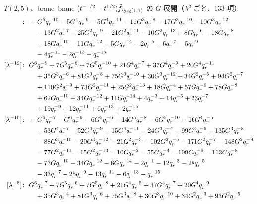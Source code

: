 $T(2,5)$、brane--brane $(t^{-1/2} - t^{1/2})\hat f_{\yoneone}$ の $G$ 展開（$\lambda^\beta$ ごと、133 項）
\begin{align*}
[\lambda^{-14}]\colon\ & -G^{5} \qr^{-10} -5 G^{4} \qr^{-9} -5 G^{4} \qr^{-11} -11 G^{3} \qr^{-8} -17 G^{3} \qr^{-10} -10 G^{3} \qr^{-12} \\
& \quad -13 G^{2} \qr^{-7} -25 G^{2} \qr^{-9} -21 G^{2} \qr^{-11} -10 G^{2} \qr^{-13} -8 G \qr^{-6} -18 G \qr^{-8} \\
& \quad -18 G \qr^{-10} -11 G \qr^{-12} -5 G \qr^{-14} -2 \qr^{-5} -6 \qr^{-7} -5 \qr^{-9} \\
& \quad -4 \qr^{-11} -2 \qr^{-13} -\qr^{-15} \\
[\lambda^{-12}]\colon\ & G^{6} \qr^{-9} +7 G^{5} \qr^{-8} +7 G^{5} \qr^{-10} +21 G^{4} \qr^{-7} +37 G^{4} \qr^{-9} +20 G^{4} \qr^{-11} \\
& \quad +35 G^{3} \qr^{-6} +81 G^{3} \qr^{-8} +75 G^{3} \qr^{-10} +30 G^{3} \qr^{-12} +34 G^{2} \qr^{-5} +94 G^{2} \qr^{-7} \\
& \quad +110 G^{2} \qr^{-9} +73 G^{2} \qr^{-11} +25 G^{2} \qr^{-13} +18 G \qr^{-4} +57 G \qr^{-6} +78 G \qr^{-8} \\
& \quad +62 G \qr^{-10} +34 G \qr^{-12} +11 G \qr^{-14} +4 \qr^{-3} +14 \qr^{-5} +23 \qr^{-7} \\
& \quad +19 \qr^{-9} +12 \qr^{-11} +6 \qr^{-13} +2 \qr^{-15} \\
[\lambda^{-10}]\colon\ & -G^{6} \qr^{-7} -G^{6} \qr^{-9} -6 G^{5} \qr^{-6} -14 G^{5} \qr^{-8} -6 G^{5} \qr^{-10} -16 G^{4} \qr^{-5} \\
& \quad -53 G^{4} \qr^{-7} -52 G^{4} \qr^{-9} -15 G^{4} \qr^{-11} -24 G^{3} \qr^{-4} -99 G^{3} \qr^{-6} -135 G^{3} \qr^{-8} \\
& \quad -88 G^{3} \qr^{-10} -20 G^{3} \qr^{-12} -21 G^{2} \qr^{-3} -102 G^{2} \qr^{-5} -171 G^{2} \qr^{-7} -148 G^{2} \qr^{-9} \\
& \quad -77 G^{2} \qr^{-11} -15 G^{2} \qr^{-13} -10 G \qr^{-2} -55 G \qr^{-4} -109 G \qr^{-6} -113 G \qr^{-8} \\
& \quad -73 G \qr^{-10} -34 G \qr^{-12} -6 G \qr^{-14} -2 \qr^{-1} -12 \qr^{-3} -28 \qr^{-5} \\
& \quad -33 \qr^{-7} -25 \qr^{-9} -13 \qr^{-11} -6 \qr^{-13} -\qr^{-15} \\
[\lambda^{-8}]\colon\ & G^{6} \qr^{-7} +7 G^{5} \qr^{-6} +7 G^{5} \qr^{-8} +21 G^{4} \qr^{-5} +37 G^{4} \qr^{-7} +20 G^{4} \qr^{-9} \\
& \quad +35 G^{3} \qr^{-4} +81 G^{3} \qr^{-6} +75 G^{3} \qr^{-8} +30 G^{3} \qr^{-10} +34 G^{2} \qr^{-3} +93 G^{2} \qr^{-5} \\

\end{align*}
